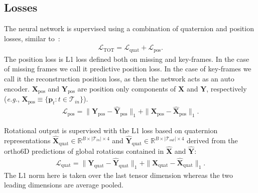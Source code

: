 \documentclass[letterpaper]{article} \usepackage[]{aaai23}  \usepackage{times}  \usepackage{helvet}  \usepackage{courier}  \usepackage[hyphens]{url}  \usepackage{graphicx} \urlstyle{rm} \def\UrlFont{\rm}  \usepackage{natbib}  \usepackage{caption} \frenchspacing  \setlength{\pdfpagewidth}{8.5in} \setlength{\pdfpageheight}{11in}
\renewcommand{\vec}[1]{\mathbf{#1}}
\begin{document}
\subsection{Losses}
The neural network is supervised using a combination of quaternion and position losses, similar to~\cite{duan2021singleshot}:
\begin{align}
\mathcal{L}_{\textrm{TOT}} = \mathcal{L}_{\textrm{quat}} + \mathcal{L}_{\textrm{pos}}. \nonumber
\end{align}
The position loss is L1 loss defined both on missing and key-frames. In the case of missing frames we call it predictive position loss. In the case of key-frames we call it the reconstruction position loss, as then the network acts as an auto encoder. $\vec{X}_{\textrm{pos}}$ and $\vec{Y}_{\textrm{pos}}$ are position only components of $\vec{X}$ and $\vec{Y}$, respectively (\emph{e.g.}, $\vec{X}_{\textrm{pos}} \equiv \{ \vec{p}_t: t \in \mathcal{T}_{in} \}$).
\begin{align} \label{eqn:position_loss}
\mathcal{L}_{\textrm{pos}} = \| \vec{Y}_{\textrm{pos}} - \widehat{\vec{Y}}_{\textrm{pos}} \|_1 + \| \vec{X}_{\textrm{pos}} - \widehat{\vec{X}}_{\textrm{pos}} \|_1. 
\end{align}




Rotational output is supervised with the L1 loss based on quaternion representations $\widehat{\vec{X}}_{\textrm{quat}} \in \mathbb{R}^{B\times|\mathcal{T}_{in}|\times 4}$ and $\widehat{\vec{Y}}_{\textrm{quat}} \in \mathbb{R}^{B\times|\mathcal{T}_{out}|\times 4}$ derived from the ortho6D predictions of global rotations contained in $\widehat{\vec{X}}$ and $\widehat{\vec{Y}}$:
\begin{align} \label{eqn:quaternion_loss}
\mathcal{L}_{\textrm{quat}} = \| \vec{Y}_{\textrm{quat}} - \widehat{\vec{Y}}_{\textrm{quat}} \|_1 + \| \vec{X}_{\textrm{quat}} - \widehat{\vec{X}}_{\textrm{quat}} \|_1. 
\end{align}
The L1 norm here is taken over the last tensor dimension whereas the two leading dimensions are average pooled.
\end{document}
